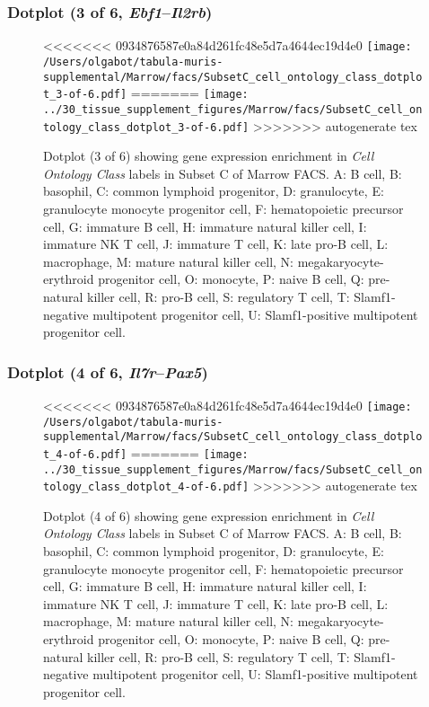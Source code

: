 \clearpage

\subsubsection{Dotplot (3 of 6, \emph{Ebf1}--\emph{Il2rb})}
\begin{figure}[h]
\centering
<<<<<<< 0934876587e0a84d261fc48e5d7a4644ec19d4e0
\texttt{[image: /Users/olgabot/tabula-muris-supplemental/Marrow/facs/SubsetC\_cell\_ontology\_class\_dotplot\_3-of-6.pdf]}
=======
\texttt{[image: ../30\_tissue\_supplement\_figures/Marrow/facs/SubsetC\_cell\_ontology\_class\_dotplot\_3-of-6.pdf]}
>>>>>>> autogenerate tex

\caption{ Dotplot (3 of 6)  showing gene expression enrichment in \emph{Cell Ontology Class} labels in Subset C of Marrow FACS. A: B cell, B: basophil, C: common lymphoid progenitor, D: granulocyte, E: granulocyte monocyte progenitor cell, F: hematopoietic precursor cell, G: immature B cell, H: immature natural killer cell, I: immature NK T cell, J: immature T cell, K: late pro-B cell, L: macrophage, M: mature natural killer cell, N: megakaryocyte-erythroid progenitor cell, O: monocyte, P: naive B cell, Q: pre-natural killer cell, R: pro-B cell, S: regulatory T cell, T: Slamf1-negative multipotent progenitor cell, U: Slamf1-positive multipotent progenitor cell.}
\end{figure}


\clearpage

\subsubsection{Dotplot (4 of 6, \emph{Il7r}--\emph{Pax5})}
\begin{figure}[h]
\centering
<<<<<<< 0934876587e0a84d261fc48e5d7a4644ec19d4e0
\texttt{[image: /Users/olgabot/tabula-muris-supplemental/Marrow/facs/SubsetC\_cell\_ontology\_class\_dotplot\_4-of-6.pdf]}
=======
\texttt{[image: ../30\_tissue\_supplement\_figures/Marrow/facs/SubsetC\_cell\_ontology\_class\_dotplot\_4-of-6.pdf]}
>>>>>>> autogenerate tex

\caption{ Dotplot (4 of 6)  showing gene expression enrichment in \emph{Cell Ontology Class} labels in Subset C of Marrow FACS. A: B cell, B: basophil, C: common lymphoid progenitor, D: granulocyte, E: granulocyte monocyte progenitor cell, F: hematopoietic precursor cell, G: immature B cell, H: immature natural killer cell, I: immature NK T cell, J: immature T cell, K: late pro-B cell, L: macrophage, M: mature natural killer cell, N: megakaryocyte-erythroid progenitor cell, O: monocyte, P: naive B cell, Q: pre-natural killer cell, R: pro-B cell, S: regulatory T cell, T: Slamf1-negative multipotent progenitor cell, U: Slamf1-positive multipotent progenitor cell.}
\end{figure}


